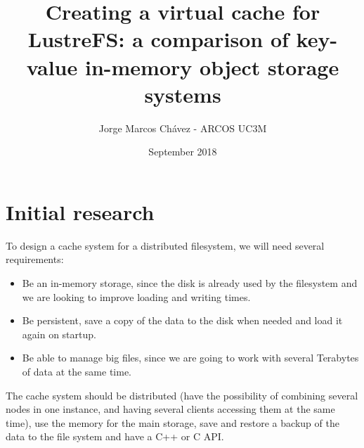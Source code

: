 \documentclass[12pt]{article}
\title{Creating a virtual cache for LustreFS: a comparison of key-value in-memory object storage systems}
\author{Jorge Marcos Chávez - ARCOS UC3M}
\date{September 2018}
\begin{document}
\maketitle
\thispagestyle{empty}

\tableofcontents
\newpage

\section{Initial research}

To design a cache system for a distributed filesystem, we will need several requirements:
\begin{itemize}
    \item Be an in-memory storage, since the disk is already used by the filesystem and we are looking to improve loading and writing times.
    \item Be persistent, save a copy of the data to the disk when needed and load it again on startup.
    \item Be able to manage big files, since we are going to work with several Terabytes of data at the same time.
\end{itemize}
The cache system should be distributed (have the possibility of combining several nodes in one instance, and having several clients accessing them at the same time), use the memory for the main storage, save and restore a backup of the data to the file system and have a C++ or C API.
\end{document}
